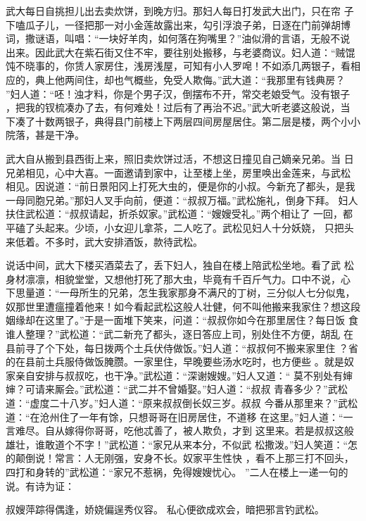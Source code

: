 武大每日自挑担儿出去卖炊饼，到晚方归。那妇人每日打发武大出门，只在帘
子下嗑瓜子儿，一径把那一对小金莲故露出来，勾引浮浪子弟，日逐在门前弹胡博
词，撒谜语，叫唱：“一块好羊肉，如何落在狗嘴里？”油似滑的言语，无般不说
出来。因此武大在紫石街又住不牢，要往别处搬移，与老婆商议。妇人道：“贼馄
饨不晓事的，你赁人家房住，浅房浅屋，可知有小人罗唣！不如添几两银子，看相
应的，典上他两间住，却也气概些，免受人欺侮。”武大道：“我那里有钱典房？
”妇人道：“呸！浊才料，你是个男子汉，倒摆布不开，常交老娘受气。没有银子
，把我的钗梳凑办了去，有何难处！过后有了再治不迟。”武大听老婆这般说，当
下凑了十数两银子，典得县门前楼上下两层四间房屋居住。第二层是楼，两个小小
院落，甚是干净。

武大自从搬到县西街上来，照旧卖炊饼过活，不想这日撞见自己嫡亲兄弟。当
日兄弟相见，心中大喜。一面邀请到家中，让至楼上坐，房里唤出金莲来，与武松
相见。因说道：“前日景阳冈上打死大虫的，便是你的小叔。今新充了都头，是我
一母同胞兄弟。”那妇人叉手向前，便道：“叔叔万福。”武松施礼，倒身下拜。
妇人扶住武松道：“叔叔请起，折杀奴家。”武松道：“嫂嫂受礼。”两个相让了
一回，都平磕了头起来。少顷，小女迎儿拿茶，二人吃了。武松见妇人十分妖娆，
只把头来低着。不多时，武大安排酒饭，款待武松。

说话中间，武大下楼买酒菜去了，丢下妇人，独自在楼上陪武松坐地。看了武
松身材凛凛，相貌堂堂，又想他打死了那大虫，毕竟有千百斤气力。口中不说，心
下思量道：“一母所生的兄弟，怎生我家那身不满尺的丁树，三分似人七分似鬼，
奴那世里遭瘟撞着他来！如今看起武松这般人壮健，何不叫他搬来我家住？想这段
姻缘却在这里了。”于是一面堆下笑来，问道：“叔叔你如今在那里居住？每日饭
食谁人整理？”武松道：“武二新充了都头，逐日答应上司，别处住不方便，胡乱
在县前寻了个下处，每日拨两个土兵伏侍做饭。”妇人道：“叔叔何不搬来家里住
？省的在县前土兵服侍做饭腌臜。一家里住，早晚要些汤水吃时，也方便些
。就是奴家亲自安排与叔叔吃，也干净。”武松道：“深谢嫂嫂。”妇人又道：“
莫不别处有婶婶？可请来厮会。”武松道：“武二并不曾婚娶。”妇人道：“叔叔
青春多少？”武松道：“虚度二十八岁。”妇人道：“原来叔叔倒长奴三岁。叔叔
今番从那里来？”武松道：“在沧州住了一年有馀，只想哥哥在旧房居住，不道移
在这里。”妇人道：“一言难尽。自从嫁得你哥哥，吃他忒善了，被人欺负，才到
这里来。若是叔叔这般雄壮，谁敢道个不字！”武松道：“家兄从来本分，不似武
松撒泼。”妇人笑道：“怎的颠倒说！常言：人无刚强，安身不长。奴家平生性快
，看不上那三打不回头，四打和身转的”武松道：“家兄不惹祸，免得嫂嫂忧心。
”二人在楼上一递一句的说。有诗为证：

叔嫂萍踪得偶逢，娇娆偏逞秀仪容。
私心便欲成欢会，暗把邪言钓武松。

